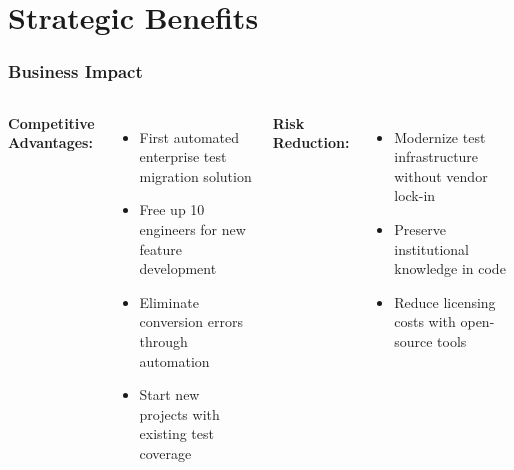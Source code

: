 \section{Strategic Benefits}

\begin{frame}
\frametitle{Business Impact}
\begin{columns}[T]
\textbf{Competitive Advantages:}
\vspace{0.2cm}
{\footnotesize
\begin{itemize}
    \item First automated enterprise test migration solution
    \item Free up 10 engineers for new feature development
    \item Eliminate conversion errors through automation
    \item Start new projects with existing test coverage
\end{itemize}
}


\textbf{Risk Reduction:}
\vspace{0.2cm}
{\footnotesize
\begin{itemize}
    \item Modernize test infrastructure without vendor lock-in
    \item Preserve institutional knowledge in code
    \item Reduce licensing costs with open-source tools
\end{itemize}
}
\end{columns}
\end{frame}

